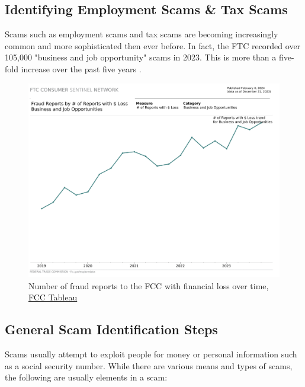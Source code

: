 \begin{fullwidth}
\section{Identifying Employment Scams \& Tax Scams} %
Scams such as employment scams and tax scams are becoming increasingly common and more sophisticated then ever before. In fact, the FTC recorded over 105,000 "business and job opportunity" scams in 2023. This is more than a five-fold increase over the past five years \autocite{Heath:2024}.

\begin{figure}[H] %
    \centering
    \includegraphics[width=.75\linewidth]{assets/Trends Over Time.png}
    \captionsetup{justification=centering}
    \caption{Number of fraud reports to the FCC with financial loss over time, \href{https://public.tableau.com/shared/HCT8WGQK8?:display_count=n&:origin=viz_share_link}{FCC Tableau}}
\end{figure}

\subsection{General Scam Identification Steps} %

Scams usually attempt to exploit people for money or personal information such as a social security number. While there are various means and types of scams, the following are usually elements in a scam:


\end{fullwidth}
